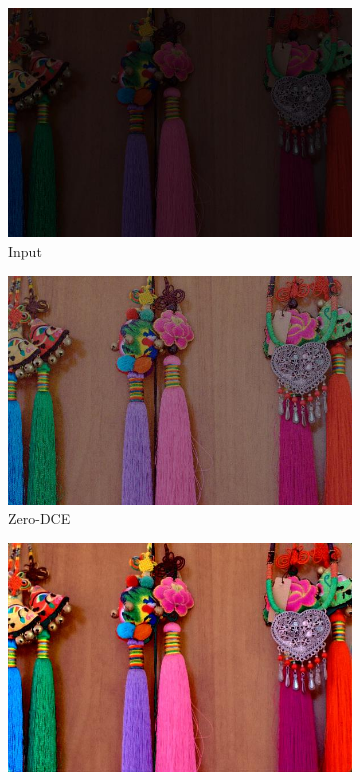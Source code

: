 \documentclass[a4paper]{ctexart}
\begin{document}
		\begin{figure}[htb]
			\centering
			\begin{subfigure}{0.19\textwidth}
				\includegraphics[width=\linewidth]{picture/LLIE/Experiment/Input1}
				\captionsetup{font=scriptsize}
				\caption{Input}
				\label{fig: Input1}
			\end{subfigure}
			\begin{subfigure}{0.19\textwidth}
				\includegraphics[width=\linewidth]{picture/LLIE/Experiment/Zero-DCE1}				
				\captionsetup{font=scriptsize}
				\caption{Zero-DCE}
				\label{fig: Zero-DCE1}	
			\end{subfigure}
			\begin{subfigure}{0.19\textwidth}
				\includegraphics[width=\linewidth]{picture/LLIE/Experiment/MBLLEN1}

\end{subfigure}
\end{figure}
\end{document}
